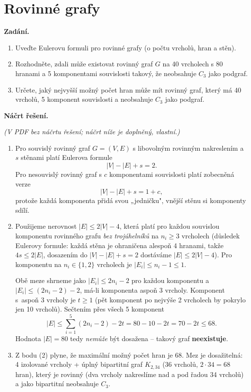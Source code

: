 \section{Rovinné grafy}

\noindent\textbf{Zadání.}\par
\begin{enumerate}
  \item Uveďte Eulerovu formuli pro rovinné grafy (o počtu vrcholů, hran a stěn).
  \item Rozhodněte, zdali může existovat rovinný graf $G$ na 40 vrcholech s 80 hranami a 5 komponentami souvislosti takový, že neobsahuje $C_3$ jako podgraf.
  \item Určete, jaký nejvyšší možný počet hran může mít rovinný graf, který má 40 vrcholů, 5 komponent souvislosti a neobsahuje $C_3$ jako podgraf.
\end{enumerate}

\medskip
\noindent\textbf{Náčrt řešení.}\par
\textit{(V PDF bez náčrtu řešení; náčrt níže je doplněný, vlastní.)}

\begin{enumerate}
  \item Pro souvislý rovinný graf $G=(V,E)$ s libovolným rovinným nakreslením a $s$ stěnami platí Eulerova formule
  \[ |V| - |E| + s = 2. \]
  Pro nesouvislý rovinný graf s $c$ komponentami souvislosti platí zobecněná verze
  \[ |V| - |E| + s = 1 + c, \]
  protože každá komponenta přidá svou „jedničku", vnější stěnu si komponenty sdílí.

  \item Použijeme nerovnost $|E|\leq 2|V|-4$, která platí pro každou souvislou komponentu rovinného grafu \emph{bez trojúhelníků} na $n_i\geq 3$ vrcholech (důsledek Eulerovy formule: každá stěna je ohraničena alespoň 4 hranami, takže $4s\leq 2|E|$, dosazením do $|V|-|E|+s=2$ dostáváme $|E|\leq 2|V|-4$). Pro komponentu na $n_i\in\{1,2\}$ vrcholech je $|E_i|\leq n_i-1\leq 1$.

  Obě meze shrneme jako $|E_i|\leq 2n_i-2$ pro každou komponentu a $|E_i|\leq (2n_i-2)-2$, má-li komponenta aspoň 3 vrcholy. Komponent s~aspoň 3 vrcholy je $t\geq 1$ (pět komponent po nejvýše 2 vrcholech by pokrylo jen 10 vrcholů). Sečtením přes všech 5 komponent
  \[ |E| \leq \sum_{i=1}^{5}(2n_i-2)-2t = 80-10-2t = 70-2t \leq 68. \]
  Hodnota $|E|=80$ tedy \emph{nemůže} být dosažena -- takový graf \textbf{neexistuje}.

  \item Z bodu (2) plyne, že maximální možný počet hran je $\boxed{68}$. Mez je dosažitelná: 4 izolované vrcholy + úplný bipartitní graf $K_{2,34}$ (36 vrcholů, $2\cdot 34=68$ hran), který je rovinný (dva vrcholy nakreslíme nad a pod řadou 34 vrcholů) a jako bipartitní neobsahuje $C_3$.
\end{enumerate}
